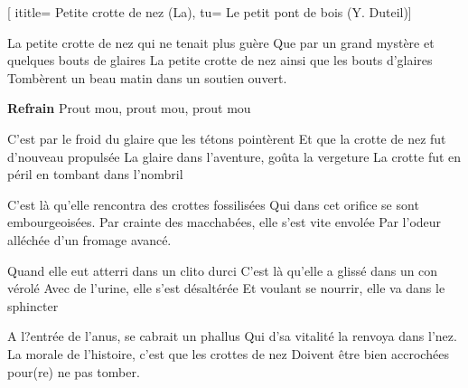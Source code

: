  [
ititle= {Petite crotte de nez (La)},
tu= {Le petit pont de bois (Y. Duteil)}]

\beginverse
La petite crotte de nez qui ne tenait plus guère
Que par un grand mystère et quelques bouts de glaires
La petite crotte de nez ainsi que les bouts d'glaires
Tombèrent un beau matin dans un soutien ouvert.
\endverse

\beginchorus
\textbf {Refrain}
Prout mou, prout mou, prout mou
\endchorus

\beginverse
C'est par le froid du glaire que les tétons pointèrent
Et que la crotte de nez fut d'nouveau propulsée
La glaire dans l'aventure, goûta la vergeture
La crotte fut en péril en tombant dans l'nombril
\endverse

\beginverse
C'est là qu'elle rencontra des crottes fossilisées
Qui dans cet orifice se sont embourgeoisées.
Par crainte des macchabées, elle s'est vite envolée
Par l'odeur alléchée d'un fromage avancé.
\endverse

\beginverse
Quand elle eut atterri dans un clito durci
C'est là qu'elle a glissé dans un con vérolé
Avec de l'urine, elle s'est désaltérée
Et voulant se nourrir, elle va dans le sphincter
\endverse

\beginverse
A l?entrée de l'anus, se cabrait un phallus
Qui d'sa vitalité la renvoya dans l'nez.
La morale de l'histoire, c'est que les crottes de nez
Doivent être bien accrochées pour(re) ne pas tomber.
\endverse

\endsong
